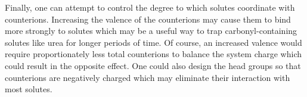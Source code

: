 \documentclass[journal=jpcbfk,manuscript=article]{achemso}
\begin{document}
  Finally, one can attempt to control the degree to which solutes coordinate
  with counterions. Increasing the valence of the counterions may cause them
  to bind more strongly to solutes which may be a useful way to trap 
  carbonyl-containing solutes like urea for longer periods of time. Of course,
  an increased valence would require proportionately less total counterions
  to balance the system charge which could result in the opposite effect. One
  could also design the head groups so that counterions are negatively charged
  which may eliminate their interaction with most solutes.
 
  
  
\end{document}

